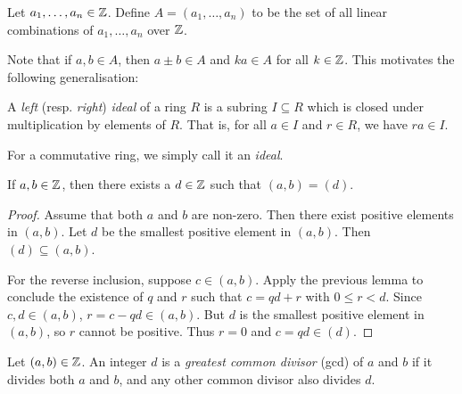 \begin{definition}
    Let $a_1, \dots, a_n \in \mathbb{Z}$.
    Define $A = (a_1, \dots, a_n)$ to be the set of all linear combinations
    of $a_1, \dots, a_n$ over $\mathbb{Z}$.
\end{definition}
Note that if $a, b \in A$, then $a \pm b \in A$ and $ka \in A$ for all
$k \in \mathbb{Z}$.
This motivates the following generalisation:
\begin{definition*}[Ideal] \label{def:ring:ideal}
    A \emph{left} (resp. \emph{right}) \emph{ideal} of a ring $R$
    is a subring $I \subseteq R$ which is closed under multiplication
    by elements of $R$.
    That is, for all $a \in I$ and $r \in R$, we have $ra \in I$.

    For a commutative ring, we simply call it an \emph{ideal}.
\end{definition*}
\begin{lemma*}
    If $a, b \in \mathbb{Z}$, then there exists a $d \in \mathbb{Z}$ such that
    $(a, b) = (d)$.
\end{lemma*}
\begin{proof}
    Assume that both $a$ and $b$ are non-zero.
    Then there exist positive elements in $(a, b)$.
    Let $d$ be the smallest positive element in $(a, b)$.
    Then $(d) \subseteq (a, b)$.

    For the reverse inclusion, suppose $c \in (a, b)$.
    Apply the previous lemma to conclude the existence of $q$ and $r$ such
    that $c = qd + r$ with $0 \le r < d$.
    Since $c, d \in (a, b)$, $r = c - qd \in (a, b)$.
    But $d$ is the smallest positive element in $(a, b)$, so $r$ cannot be
    positive.
    Thus $r = 0$ and $c = qd \in (d)$.
\end{proof}

\begin{definition}[GCD] \label{def:gcd}
    Let $(a, b) \in \mathbb{Z}$.
    An integer $d$ is a \emph{greatest common divisor} (gcd) of $a$ and $b$
    if it divides both $a$ and $b$, and any other common divisor also
    divides $d$.
\end{definition}
